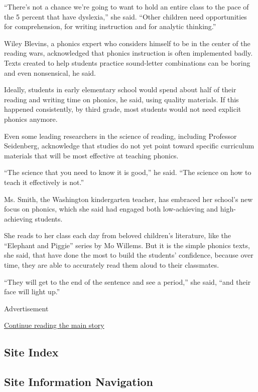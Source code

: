 ``There's not a chance we're going to want to hold an entire class to
the pace of the 5 percent that have dyslexia,'' she said. ``Other
children need opportunities for comprehension, for writing instruction
and for analytic thinking.''

Wiley Blevins, a phonics expert who considers himself to be in the
center of the reading wars, acknowledged that phonics instruction is
often implemented badly. Texts created to help students practice
sound-letter combinations can be boring and even nonsensical, he said.

Ideally, students in early elementary school would spend about half of
their reading and writing time on phonics, he said, using quality
materials. If this happened consistently, by third grade, most students
would not need explicit phonics anymore.

Even some leading researchers in the science of reading, including
Professor Seidenberg, acknowledge that studies do not yet point toward
specific curriculum materials that will be most effective at teaching
phonics.

``The science that you need to know it is good,'' he said. ``The science
on how to teach it effectively is not.''

Ms. Smith, the Washington kindergarten teacher, has embraced her
school's new focus on phonics, which she said had engaged both
low-achieving and high-achieving students.

She reads to her class each day from beloved children's literature, like
the ``Elephant and Piggie'' series by Mo Willems. But it is the simple
phonics texts, she said, that have done the most to build the students'
confidence, because over time, they are able to accurately read them
aloud to their classmates.

``They will get to the end of the sentence and see a period,'' she said,
``and their face will light up.''

Advertisement

\protect\hyperlink{after-bottom}{Continue reading the main story}

\hypertarget{site-index}{%
\subsection{Site Index}\label{site-index}}

\hypertarget{site-information-navigation}{%
\subsection{Site Information
Navigation}\label{site-information-navigation}}

